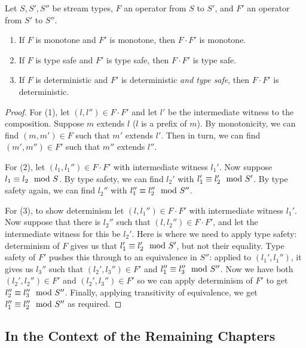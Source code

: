 \begin{proposition}
Let $S, S', S''$ be stream types, $F$ an operator from $S$ to $S'$, and $F'$ an operator from $S'$ to $S''$.
\begin{enumerate}
  \item If $F$ is monotone and $F'$ is monotone, then $F \cdot F'$ is monotone.
  \item If $F$ is type safe and $F'$ is type safe, then $F \cdot F'$ is type safe.
  \item If $F$ is deterministic and $F'$ is deterministic \emph{and type safe}, then $F \cdot F'$ is deterministic.
\end{enumerate}
\end{proposition}
\begin{proof}
For (1), let $(l, l'') \in F \cdot F'$ and let $l'$ be the intermediate witness to the composition. Suppose $m$ extends $l$ ($l$ is a prefix of $m$). By monotonicity, we can find $(m, m') \in F$ such that $m'$ extends $l'$. Then in turn, we can find $(m', m'') \in F'$ such that $m''$ extends $l''$.

For (2), let $(l_1, l_1'') \in F \cdot F'$ with intermediate witness $l_1'$.
Now suppose $l_1 \equiv l_2 \mod {S}$.
By type safety, we can find $l_2'$ with $l_1' \equiv l_2' \mod {S'}$.
By type safety again, we can find $l_2''$ with $l_1'' \equiv l_2'' \mod {S''}$.

For (3), to show determinism let $(l, l_1'') \in F \cdot F'$ with intermediate witness $l_1'$.
Now suppose that there is $l_2''$ such that
$(l, l_2'') \in F \cdot F'$, and let the intermediate witness for this be $l_2'$. Here is where we need to apply type safety: determinism of $F$ gives us that $l_1' \equiv l_2' \mod {S'}$, but not their equality.
Type safety of $F'$ pushes this through to an equivalence in $S''$:
applied to $(l_1', l_1'')$, it gives us $l_3''$ such that $(l_2', l_3'') \in F'$ and $l_1'' \equiv l_3'' \mod {S''}$.
Now we have both $(l_2', l_2'') \in F'$ and $(l_2', l_3'') \in F'$ so we can apply determinism of $F'$ to get $l_2'' \equiv l_3'' \mod {S''}$.
Finally, applying transitivity of equivalence, we get
$l_1'' \equiv l_2'' \mod {S''}$ as required.
\end{proof}

\subsection{In the Context of the Remaining Chapters}

